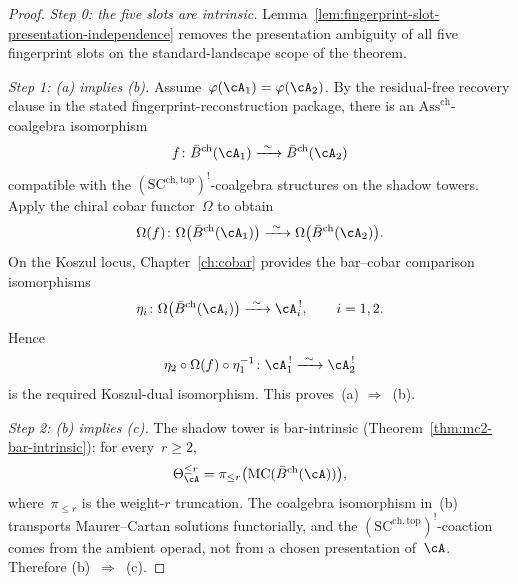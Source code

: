 \begin{proof}
\textit{Step 0: the five slots are intrinsic.}
Lemma~\ref{lem:fingerprint-slot-presentation-independence} removes the
presentation ambiguity of all five fingerprint slots on the
standard-landscape scope of the theorem.

\emph{Step 1: \textup{(a)} implies \textup{(b)}.}
Assume~$\varphi(\cA_1)=\varphi(\cA_2)$. By
the residual-free recovery clause in the stated
fingerprint-reconstruction package, there is an
$\mathrm{Ass}^{\mathrm{ch}}$-coalgebra isomorphism
\[
f\colon \bar{B}^{\mathrm{ch}}(\cA_1)\xrightarrow{\ \sim\ }
\bar{B}^{\mathrm{ch}}(\cA_2)
\]
compatible with the
$(\mathrm{SC}^{\mathrm{ch,top}})^!$-coalgebra structures on the shadow
towers. Apply the chiral cobar functor~$\Omega$ to obtain
\[
\Omega(f)\colon
\Omega\bigl(\bar{B}^{\mathrm{ch}}(\cA_1)\bigr)\xrightarrow{\ \sim\ }
\Omega\bigl(\bar{B}^{\mathrm{ch}}(\cA_2)\bigr).
\]
On the Koszul locus, Chapter~\ref{ch:cobar} provides the bar--cobar
comparison isomorphisms
\[
\eta_i\colon
\Omega\bigl(\bar{B}^{\mathrm{ch}}(\cA_i)\bigr)\xrightarrow{\ \sim\ }\cA_i^{\,!},
\qquad i=1,2.
\]
Hence
\[
\eta_2\circ \Omega(f)\circ \eta_1^{-1}\colon
\cA_1^{\,!}\xrightarrow{\ \sim\ }\cA_2^{\,!}
\]
is the required Koszul-dual isomorphism. This proves~\textup{(a)}
$\Rightarrow$~\textup{(b)}.

\emph{Step 2: \textup{(b)} implies \textup{(c)}.}
The shadow tower is bar-intrinsic
\textup{(}Theorem~\ref{thm:mc2-bar-intrinsic}\textup{)}: for
every~$r\geq 2$,
\[
\Theta_\cA^{\leq r}
=
\pi_{\leq r}\bigl(\mathrm{MC}(\bar{B}^{\mathrm{ch}}(\cA))\bigr),
\]
where~$\pi_{\leq r}$ is the weight-$r$ truncation. The coalgebra
isomorphism in~\textup{(b)} transports Maurer--Cartan solutions
functorially, and the
$(\mathrm{SC}^{\mathrm{ch,top}})^!$-coaction comes from the ambient
operad, not from a chosen presentation of~$\cA$. Therefore
\textup{(b)}~$\Rightarrow$~\textup{(c)}.


\end{proof}
